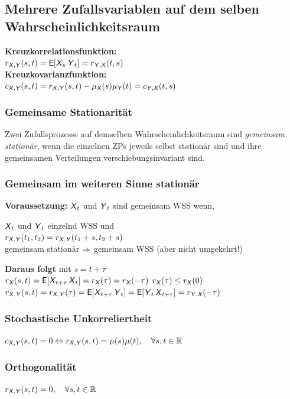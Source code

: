 \documentclass[german,color,6pt]{latex4ei/latex4ei_sheet}
\begin{document}
\begin{sectionbox}
	\subsection{Mehrere Zufallsvariablen auf dem selben Wahrscheinlichkeitsraum}
	\begin{emphbox}
		\raggedright
		\textbf{Kreuzkorrelationsfunktion:} \\ $r_{\X,\Y}(s,t) = \E[\X_s \Y_t] = r_{\Y,\X}(t,s)$\\
		\textbf{Kreuzkovarianzfunktion:}\\ $c_{\X,\Y}(s,t) = r_{\X,\Y}(s,t) - \mu_{\X}(s)\mu_{\Y}(t) = c_{\Y,\X}(t,s)$
	\end{emphbox}
	
	\subsubsection{Gemeinsame Stationarität}
	Zwei Zufallsprozesse auf demselben Wahrscheinlichkeitsraum sind \emph{gemeinsam stationär}, wenn die einzelnen ZPs jeweils selbst stationär sind und ihre gemeinsamen Verteilungen verschiebungsinvariant sind.
	
	\subsubsection{Gemeinsam im weiteren Sinne stationär}
	\textbf{Voraussetzung:} $\X_t$ und $\Y_t$ sind gemeinsam WSS wenn,\\
	
	\begin{emphbox}
		\raggedright
		$\X_t$ und $\Y_t$ einzelnd WSS und\\
		$r_{\X,\Y}(t_1,t_2) = r_{\X,\Y}(t_1 + s,t_2 + s)$\\
		gemeinsam stationär $\Ra$ gemeinsam WSS (aber nicht umgekehrt!)
	\end{emphbox}
	\textbf{Daraus folgt} mit $s = t + \tau$\\
	$r_{\X}(s,t) = \E[\X_{t+\tau} \X_t] = r_{\X}(\tau) = r_{\X}(-\tau)$ \qquad \quad $r_{\X}(\tau) \le r_{\X}(0)$\\
	$r_{\X,\Y}(s,t) = r_{\X,\Y}(\tau) = \E[\X_{t+\tau} \Y_t] = \E[\Y_t \X_{t+\tau}] = r_{\Y,\X}(-\tau)$
	\subsubsection{Stochastische Unkorreliertheit}
	$c_{\X,\Y}(s,t) = 0 \Leftrightarrow r_{\X,\Y}(s,t) = \mu(s)\mu(t), \quad \forall s,t \in \R$
	\subsubsection{Orthogonalität}
	$r_{\X,\Y}(s,t) = 0, \quad \forall s,t \in \R$
\end{sectionbox}
\end{document}
